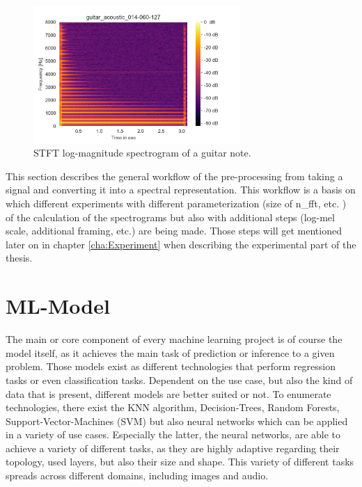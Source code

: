  \begin{figure}[htb!]
	\caption{STFT log-magnitude spectrogram of a guitar note.}
	\label{fig:spectrogram}
	\centering
	\includegraphics[width=0.7\textwidth]{images/approach/guitar_acoustic_014-060-127.png}
\end{figure}

This section describes the general workflow of the pre-processing from taking a signal and converting it into a spectral representation. This workflow is a basis on which different experiments with different parameterization (size of n\_fft, etc. ) of the calculation of the spectrograms but also with additional steps (log-mel scale, additional framing, etc.) are being made. Those steps will get mentioned later on in chapter \ref{cha:Experiment} when describing the experimental part of the thesis.

\section{ML-Model}
\label{sec:app_model}
The main or core component of every machine learning project is of course the model itself, as it achieves the main task of prediction or inference to a given problem. Those models exist as different technologies that perform regression tasks or even classification tasks. Dependent on the use case, but also the kind of data that is present, different models are better suited or not. To enumerate technologies, there exist the KNN algorithm, Decision-Trees, Random Forests, Support-Vector-Machines (SVM) but also neural networks which can be applied in a variety of use cases. Especially the latter, the neural networks, are able to achieve a variety of different tasks, as they are highly adaptive regarding their topology, used layers, but also their size and shape. This variety of different tasks spreads across different domains, including images and audio. 

